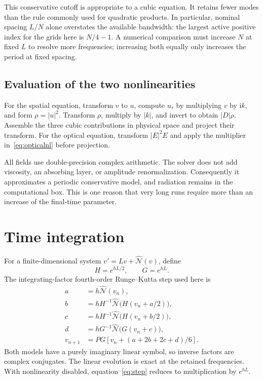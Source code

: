 \documentclass[10pt,letterpaper]{article}
\numberwithin{equation}{section}
\newcommand{\ii}{\mathrm{i}}
\begin{document}
This conservative cutoff is appropriate to a cubic equation. It retains fewer modes than the rule commonly used for quadratic products. In particular, nominal spacing $L/N$ alone overstates the available bandwidth: the largest active positive index for the grids here is $N/4-1$. A numerical comparison must increase $N$ at fixed $L$ to resolve more frequencies; increasing both equally only increases the period at fixed spacing.

\subsection{Evaluation of the two nonlinearities}
For the spatial equation, transform $v$ to $u$, compute $u_\tau$ by multiplying $v$ by $\ii k$, and form $\rho=|u|^2$. Transform $\rho$, multiply by $|k|$, and invert to obtain $|D|\rho$. Assemble the three cubic contributions in physical space and project their transform. For the optical equation, transform $|E|^2E$ and apply the multiplier in~\eqref{eq:opticalnl} before projection.

All fields use double-precision complex arithmetic. The solver does not add viscosity, an absorbing layer, or amplitude renormalization. Consequently it approximates a periodic conservative model, and radiation remains in the computational box. This is one reason that very long runs require more than an increase of the final-time parameter.

\section{Time integration}
For a finite-dimensional system $v'=Lv+\widehat{\mathcal N}(v)$, define
\begin{equation}
 H=e^{hL/2},\qquad G=e^{hL}.
\end{equation}
The integrating-factor fourth-order Runge--Kutta step used here is
\begin{align}
 a&=h\widehat{\mathcal N}(v_n),\\
 b&=hH^{-1}\widehat{\mathcal N}\bigl(H(v_n+a/2)\bigr),\\
 c&=hH^{-1}\widehat{\mathcal N}\bigl(H(v_n+b/2)\bigr),\\
 d&=hG^{-1}\widehat{\mathcal N}\bigl(G(v_n+c)\bigr),\\
 v_{n+1}&=PG\left[v_n+(a+2b+2c+d)/6\right].\label{eq:step}
\end{align}
Both models have a purely imaginary linear symbol, so inverse factors are complex conjugates. The linear evolution is exact at the retained frequencies. With nonlinearity disabled, equation~\eqref{eq:step} reduces to multiplication by $e^{hL}$.
\end{document}
